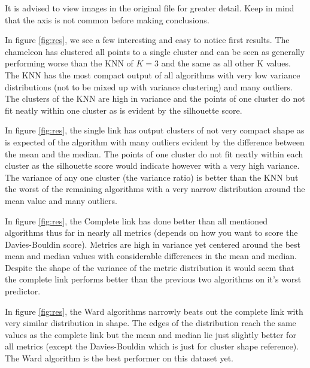 \documentclass[12pt, a4paper]{article}
\begin{document}
                \begin{multicols}{2}

                It is advised to view images in the original file for greater detail. Keep in mind that the axis is not common before making conclusions.
                \newline

                In figure \ref{fig:res}, we see a few interesting and easy to notice first results. The chameleon has clustered all points to a single cluster and can be seen as generally performing worse than the KNN of $K=3$ and the same as all other K values. The KNN has the most compact output of all algorithms with very low variance distributions (not to be mixed up with variance clustering) and many outliers. The clusters of the KNN are high in variance and the points of one cluster do not fit neatly within one cluster as is evident by the silhouette score.
                \newline

                In figure \ref{fig:res}, the single link has output clusters of not very compact shape as is expected of the algorithm with many outliers evident by the difference between the mean and the median. The points of one cluster do not fit neatly within each cluster as the silhouette score would indicate however with a very high variance. The variance of any one cluster (the variance ratio) is better than the KNN but the worst of the remaining algorithms with a very narrow distribution around the mean value and many outliers.
                \newline

                In figure \ref{fig:res}, the Complete link has done better than all mentioned algorithms thus far in nearly all metrics (depends on how you want to score the Davies-Bouldin score). Metrics are high in variance yet centered around the best mean and median values with considerable differences in the mean and median. Despite the shape of the variance of the metric distribution it would seem that the complete link performs better than the previous two algorithms on it's worst predictor.
                \newline

                In figure \ref{fig:res}, the Ward algorithms narrowly beats out the complete link with very similar distribution in shape. The edges of the distribution reach the same values as the complete link but the mean and median lie just slightly better for all metrics (except the Davies-Bouldin which is just for cluster shape reference). The Ward algorithm is the best performer on this dataset yet.
                \newline


\end{multicols}
\end{document}
